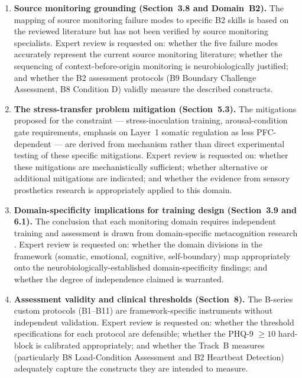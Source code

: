 \documentclass[12pt, a4paper]{article}
\begin{document}
\begin{enumerate}[leftmargin=2em]

\item \textbf{Source monitoring grounding (Section~3.8 and Domain~B2).}
The mapping of source monitoring failure modes to specific B2 skills is based on
the reviewed literature but has not been verified by source monitoring specialists.
Expert review is requested on: whether the five failure modes accurately represent
the current source monitoring literature; whether the sequencing of context-before-origin
monitoring is neurobiologically justified; and whether the B2 assessment protocols
(B9 Boundary Challenge Assessment, B8 Condition D) validly measure the described
constructs.

\item \textbf{The stress-transfer problem mitigation (Section~5.3).}
The mitigations proposed for the \citet{raio2013} constraint --- stress-inoculation
training, arousal-condition gate requirements, emphasis on Layer~1 somatic regulation
as less PFC-dependent --- are derived from mechanism rather than direct experimental
testing of these specific mitigations. Expert review is requested on: whether these
mitigations are mechanistically sufficient; whether alternative or additional
mitigations are indicated; and whether the evidence from sensory prosthetics research
\citep{beyeler2017} is appropriately applied to this domain.

\item \textbf{Domain-specificity implications for training design (Section~3.9 and 6.1).}
The conclusion that each monitoring domain requires independent training and
assessment is drawn from domain-specific metacognition research \citep{morales2018,
fleming2014}. Expert review is requested on: whether the domain divisions in the
framework (somatic, emotional, cognitive, self-boundary) map appropriately onto the
neurobiologically-established domain-specificity findings; and whether the degree
of independence claimed is warranted.

\item \textbf{Assessment validity and clinical thresholds (Section~8).}
The B-series custom protocols (B1--B11) are framework-specific instruments without
independent validation. Expert review is requested on: whether the threshold
specifications for each protocol are defensible; whether the PHQ-9 $\geq 10$
hard-block is calibrated appropriately; and whether the Track~B measures (particularly
B8 Load-Condition Assessment and B2 Heartbeat Detection) adequately capture the
constructs they are intended to measure.


\end{enumerate}
\end{document}
